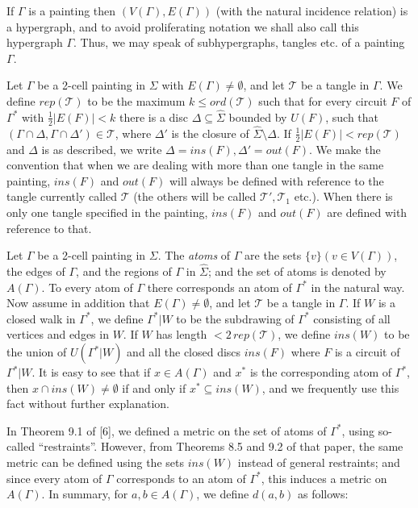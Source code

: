 If $\Gamma$ is a painting then $(V(\Gamma), E(\Gamma))$ (with the natural incidence relation) is a hypergraph, and to avoid proliferating notation we shall also call this hypergraph $\Gamma$. Thus, we may speak of subhypergraphs, tangles etc. of a painting $\Gamma$.

Let $\Gamma$ be a 2-cell painting in $\Sigma$ with $E(\Gamma)\ne \emptyset$, and let $\mathscr{T}$ be a tangle in $\Gamma$. We define $rep(\mathscr{T})$ to be the maximum $k\le ord(\mathscr{T})$ such that for every circuit $F$ of $\Gamma^*$ with $\frac{1}{2}|E(F)|<k$ there is a disc $\Delta\subseteq \hat{\Sigma}$ bounded by $U(F)$, such that $(\Gamma\cap \Delta, \Gamma\cap \Delta')\in \mathscr{T}$, where $\Delta'$ is the closure of $\hat{\Sigma}\setminus \Delta$. If $\frac{1}{2}|E(F)|<rep(\mathscr{T})$ and $\Delta$ is as described, we write $\Delta = ins(F), \Delta' = out(F)$. We make the convention that when we are dealing with more than one tangle in the same painting, $ins(F)$ and $out(F)$ will always be defined with reference to the tangle currently called $\mathscr{T}$ (the others will be called $\mathscr{T}', \mathscr{T}_1$ etc.). When there is only one tangle specified in the painting, $ins(F)$ and $out(F)$ are defined with reference to that.

Let $\Gamma$ be a 2-cell painting in $\Sigma$. The \textit{atoms} of $\Gamma$ are the sets $\{v\} (v\in V(\Gamma))$, the edges of $\Gamma$, and the regions of $\Gamma$ in $\hat{\Sigma}$; and the set of atoms is denoted by $A(\Gamma)$. To every atom of $\Gamma$ there corresponds an atom of $\Gamma^*$ in the natural way. Now assume in addition that $E(\Gamma)\ne \emptyset$, and let $\mathscr{T}$ be a tangle in $\Gamma$. If $W$ is a closed walk in $\Gamma^*$, we define $\Gamma^*|W$ to be the subdrawing of $\Gamma^*$ consisting of all vertices and edges in $W$. If $W$ has length $<2\,rep(\mathscr{T})$, we define $ins(W)$ to be the union of $U(\Gamma^*|W)$ and all the closed discs $ins(F)$ where $F$ is a circuit of $\Gamma^*|W$. It is easy to see that if $x\in A(\Gamma)$ and $x^*$ is the corresponding atom of $\Gamma^*$, then $x\cap ins(W)\ne \emptyset$ if and only if $x^*\subseteq ins(W)$, and we frequently use this fact without further explanation.

In Theorem 9.1 of [6], we defined a metric on the set of atoms of $\Gamma^*$, using so-called ``restraints''. However, from Theorems 8.5 and 9.2 of that paper, the same metric can be defined using the sets $ins(W)$ instead of general restraints; and since every atom of $\Gamma$ corresponds to an atom of $\Gamma^*$, this induces a metric on $A(\Gamma)$. In summary, for $a, b\in A(\Gamma)$, we define $d(a, b)$ as follows:

